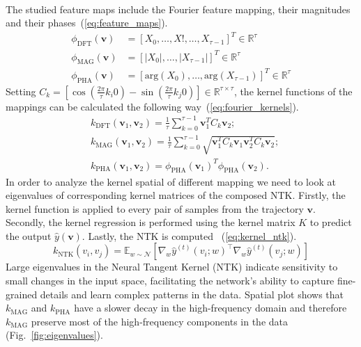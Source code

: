 \documentclass[acmtog]{techreportacmart}
\begin{document}
\\
The studied feature maps include the Fourier feature mapping, their magnitudes and their phases~(\ref{eq:feature_maps}).
\begin{equation}
  \label{eq:feature_maps}
  \begin{aligned}
  \phi_{\text{DFT}}(\mathbf{v}) &= [X_0, \ldots, X!, \ldots, X_{\tau-1}]^T \in \mathbb{R}^\tau \\
  \phi_{\text{MAG}}(\mathbf{v}) &= [|X_0|, \ldots, |X_{\tau-1}|]^T \in \mathbb{R}^\tau \\
  \phi_{\text{PHA}}(\mathbf{v}) &= [\text{arg}(X_0), \ldots, \text{arg}(X_{\tau-1})]^T \in \mathbb{R}^\tau
  \end{aligned}
\end{equation}
Setting $C_k = [\cos \left(\frac{2\pi}{\tau} k_i 0\right) - \sin \left(\frac{2\pi}{\tau} k_j 0\right)] \in \mathbb{R}^{\tau \times \tau}$, the kernel functions of the mappings can be calculated the following way~(\ref{eq:fourier_kernels}).
\begin{equation} 
  \label{eq:fourier_kernels}
  \begin{aligned}
  & k_{\text{DFT}}(\mathbf{v}_1, \mathbf{v}_2) = \frac{1}{\tau} \sum_{k=0}^{\tau-1} \mathbf{v}_1^T C_k \mathbf{v}_2; \\
  & k_{\text{MAG}}(\mathbf{v}_1, \mathbf{v}_2) = \frac{1}{\tau} \sum_{k=0}^{\tau-1} \sqrt{\mathbf{v}_1^T C_k \mathbf{v}_1 \mathbf{v}_2^T C_k \mathbf{v}_2}; \\
  & k_{\text{PHA}}(\mathbf{v}_1, \mathbf{v}_2) = \phi_{\text{PHA}}(\mathbf{v}_1)^T \phi_{\text{PHA}}(\mathbf{v}_2).
  \end{aligned}
\end{equation}
In order to analyze the kernel spatial of different mapping we need to look at eigenvalues of corresponding kernel matrices of the composed NTK. Firstly, the kernel function is applied to every pair of samples from the trajectory ${\mathbf{v}}$. Secondly, the kernel regression is performed using the kernel matrix ${K}$ to predict the output ${\hat{y}(\mathbf{v})}$. Lastly, the NTK is computed ~(\ref{eq:kernel_ntk}).
\begin{equation}
  \label{eq:kernel_ntk}
  k_{\text{NTK}}(v_i, v_j) = \mathbb{E}_{w \sim \mathcal{N}} \left[ \nabla_{w} \hat{y}^{(t)}(v_i;w)^\top \nabla_{w} \hat{y}^{(t)}(v_j;w) \right]
\end{equation}
Large eigenvalues in the Neural Tangent Kernel (NTK) indicate sensitivity to small changes in the input space, facilitating the network's ability to capture fine-grained details and learn complex patterns in the data. Spatial plot shows that $k_{\text{MAG}}$ and $k_{\text{PHA}}$ have a slower decay in the high-frequency domain and therefore $k_{\text{MAG}}$ preserve most of the high-frequency components in the data (Fig.~\ref{fig:eigenvalues}).
\end{document}
